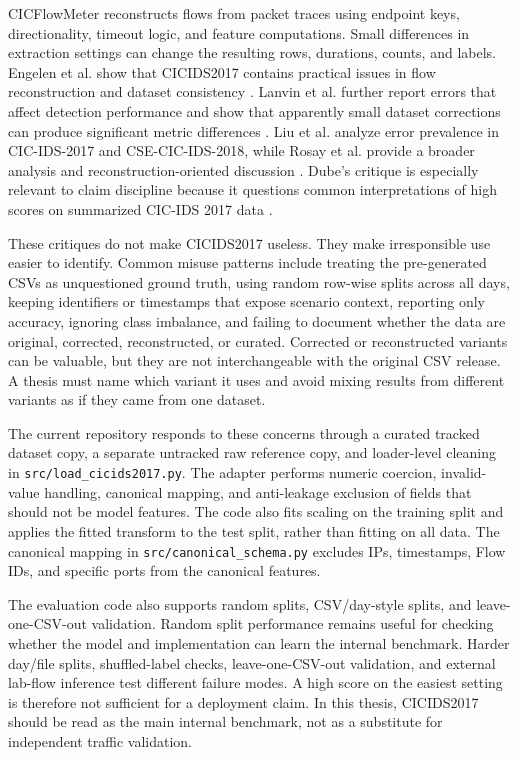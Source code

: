 CICFlowMeter reconstructs flows from packet traces using endpoint keys, directionality, timeout logic, and feature computations. Small differences in extraction settings can change the resulting rows, durations, counts, and labels. Engelen et al. show that CICIDS2017 contains practical issues in flow reconstruction and dataset consistency \parencite{Engelen2021CICIDSIssues}. Lanvin et al. further report errors that affect detection performance and show that apparently small dataset corrections can produce significant metric differences \parencite{Lanvin2023Errors,FaultyUseCICIDS2017}. Liu et al. analyze error prevalence in CIC-IDS-2017 and CSE-CIC-IDS-2018, while Rosay et al. provide a broader analysis and reconstruction-oriented discussion \parencite{Liu2022ErrorPrevalenceNIDS,Rosay2022CICIDS2017Analysis}. Dube's critique is especially relevant to claim discipline because it questions common interpretations of high scores on summarized CIC-IDS 2017 data \parencite{Dube2024FaultyCICIDS2017}.

These critiques do not make CICIDS2017 useless. They make irresponsible use easier to identify. Common misuse patterns include treating the pre-generated CSVs as unquestioned ground truth, using random row-wise splits across all days, keeping identifiers or timestamps that expose scenario context, reporting only accuracy, ignoring class imbalance, and failing to document whether the data are original, corrected, reconstructed, or curated. Corrected or reconstructed variants can be valuable, but they are not interchangeable with the original CSV release. A thesis must name which variant it uses and avoid mixing results from different variants as if they came from one dataset.

The current repository responds to these concerns through a curated tracked dataset copy, a separate untracked raw reference copy, and loader-level cleaning in \texttt{src/load\_cicids2017.py}. The adapter performs numeric coercion, invalid-value handling, canonical mapping, and anti-leakage exclusion of fields that should not be model features. The code also fits scaling on the training split and applies the fitted transform to the test split, rather than fitting on all data. The canonical mapping in \texttt{src/canonical\_schema.py} excludes IPs, timestamps, Flow IDs, and specific ports from the canonical features.

The evaluation code also supports random splits, CSV/day-style splits, and leave-one-CSV-out validation. Random split performance remains useful for checking whether the model and implementation can learn the internal benchmark. Harder day/file splits, shuffled-label checks, leave-one-CSV-out validation, and external lab-flow inference test different failure modes. A high score on the easiest setting is therefore not sufficient for a deployment claim. In this thesis, CICIDS2017 should be read as the main internal benchmark, not as a substitute for independent traffic validation.

